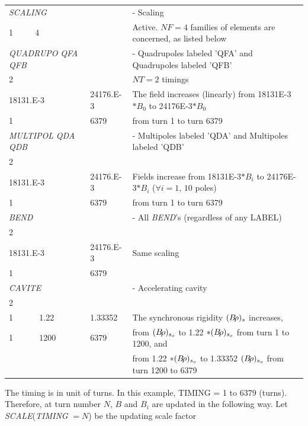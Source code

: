 {\renewcommand{\arraystretch}{1}
\noindent\begin{tabular}{lll}
  \textsl{SCALING}    &          & - Scaling \\
  1    ~~~~ 4         &          &  Active. $NF = 4$ families of elements are concerned, as listed below \\
  \textsl{QUADRUPO} \textsl{QFA} \textsl{QFB}&          & - Quadrupoles labeled 'QFA' and Quadrupoles labeled 'QFB' \\
  2                   &          & $NT = 2$ timings  \\
  18131.E-3           & 24176.E-3 \qquad 
                                 &   The field increases (linearly) from 18131E-3$\ast B_0 $ 
                                 to 24176E-3$\ast B_0 $  \\
  1                   & 6379     &  from turn 1 to turn 6379\\
  \textsl{MULTIPOL} \textsl{QDA} \textsl{QDB}&          &- Multipoles labeled 'QDA' and Multipoles labeled 'QDB'\\
  2   \\                      
  18131.E-3           &24176.E-3 &  Fields  increase from 18131E-3$\ast {B_i} $ to 
                                  24176E-3$\ast  {B_i} $  ($\forall i=1,\,10$ poles) \\
  1                   & 6379     & from turn 1 to turn 6379\\
  \textsl{BEND}       &          &- All \textsl{BEND}'s (regardless of any LABEL) \\
  2    \\
  18131.E-3           &24176.E-3 &  Same scaling \\
  1                   & 6379  \\
  \textsl{CAVITE}     &          &- Accelerating cavity \\
  2  \\
  1 ~~~~~ 1.22        &1.33352   &The synchronous rigidity $(B\!\rho )_s $ increases, \\
  1 ~~~~~   1200      & 6379     &from $ (B\!\rho )_{s_o} $ to 1.22 $\ast (B\!\rho)_{s_o} $ from turn 1 to 1200, and \\
                      &          &from 1.22 $\ast (B\!\rho)_{s_o} $ to 1.33352 $ (B\!\rho )_{s_o} $ from turn 1200 to 6379 
\end{tabular} }                   
 \bigskip

\noindent The timing is in unit of turns. In this example, TIMING = 1 to 6379 
(turns). Therefore, at turn number $ N$, $B $ and $ B_i $ are updated in the 
following way. Let \textsl{SCALE}(\textsl{TIMING} $ = N$) be the updating scale factor


